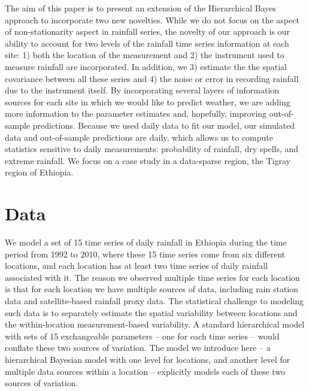 \documentclass[11pt]{article}
\begin{document}
The aim of this paper is to present an extension of the Hierarchical Bayes approach to incorporate two new novelties. While we do not focus on the aspect of non-stationarity aspect in rainfall series, the novelty of our approach is our ability to account for two levels of the rainfall time series information at each site: 1) both the location of the measurement and 2) the instrument used to measure rainfall are incorporated. In addition, we 3) estimate the the spatial covariance between all these series and 4) the noise or error in recording rainfall due to the instrument itself. By incorporating several layers of information sources for each site in which we would like to predict weather, we are adding more information to the parameter estimates and, hopefully, improving out-of-sample predictions. Because we used daily data to fit our model, our simulated data and out-of-sample predictions are daily, which allows us to compute statistics sensitive to daily measurements: probability of rainfall, dry spells, and extreme rainfall.  We focus on a case study in a data-sparse region, the Tigray region of Ethiopia.



\section{Data}\label{sec:data}

We model a set of 15 time series of daily rainfall in Ethiopia during the time period from 1992 to 2010, where these 15 time series come from six different locations, and each location has at least two time series of daily rainfall associated with it. The reason we observed multiple time series for each location is that for each location we have multiple sources of data, including rain station data and satellite-based rainfall proxy data. The statistical challenge to modeling such data is to separately estimate the spatial variability between locations and the within-location measurement-based variability. A standard hierarchical model with sets of 15 exchangeable parameters -- one for each time series -- would conflate these two sources of variation. The model we introduce here -- a hierarchical Bayesian model with one level for locations, and another level for multiple data sources within a location -- explicitly models each of these two sources of variation.
\end{document}
